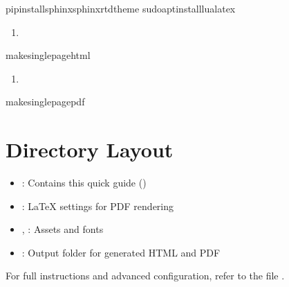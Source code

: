 \documentclass[letterpaper,11pt,oneside,english,openany,oneside]{sphinxmanual}
\begin{document}
\begin{sphinxVerbatim}[commandchars=\\\{\}]
pipinstallsphinxsphinx\PYGZus{}rtd\PYGZus{}theme
sudoaptinstalllualatex
\end{sphinxVerbatim}
\begin{enumerate}
%
\setcounter{enumi}{1}
\item {} 
\sphinxAtStartPar
{}

\end{enumerate}

\begin{sphinxVerbatim}[commandchars=\\\{\}]
makesingle\PYGZhy{}page\PYGZhy{}html
\end{sphinxVerbatim}
\begin{enumerate}
%
\setcounter{enumi}{2}
\item {} 
\sphinxAtStartPar
{}

\end{enumerate}

\begin{sphinxVerbatim}[commandchars=\\\{\}]
makesingle\PYGZhy{}page\PYGZhy{}pdf
\end{sphinxVerbatim}


\chapter{Directory Layout}
\label{\detokenize{index:directory-layout}}\begin{itemize}
\item {} 
\sphinxAtStartPar
{}: Contains this quick guide ()

\item {} 
\sphinxAtStartPar
{}: LaTeX settings for PDF rendering

\item {} 
\sphinxAtStartPar
{}, : Assets and fonts

\item {} 
\sphinxAtStartPar
{}: Output folder for generated HTML and PDF

\end{itemize}

\sphinxAtStartPar
For full instructions and advanced configuration, refer to the file .



\renewcommand{\indexname}{Index}
\printindex
\end{document}

